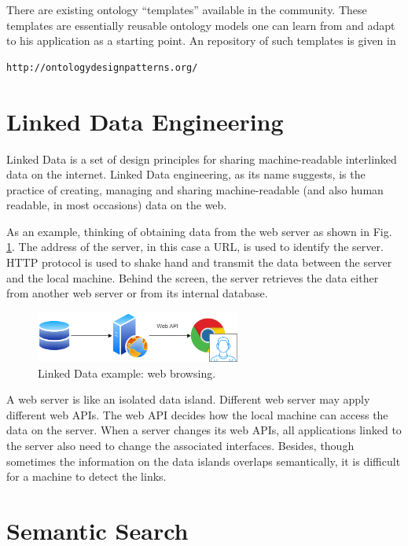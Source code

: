 There are existing ontology ``templates'' available in the community. These templates are essentially reusable ontology models one can learn from and adapt to his application as a starting point. An repository of such templates is given in 
\begin{lstlisting}
http://ontologydesignpatterns.org/
\end{lstlisting}

\section{Linked Data Engineering}

Linked Data is a set of design principles for sharing machine-readable interlinked data on the internet. Linked Data engineering, as its name suggests, is the practice of creating, managing and sharing machine-readable (and also human readable, in most occasions) data on the web.

As an example, thinking of obtaining data from the web server as shown in Fig. \ref{fig:webbrowsing}. The address of the server, in this case a URL, is used to identify the server. HTTP protocol is used to shake hand and transmit the data between the server and the local machine. Behind the screen, the server retrieves the data either from another web server or from its internal database.
\begin{figure}[htbp]
	\centering
	\includegraphics[width=0.6\textwidth]{./chapters/ch-semanticwebpractice/figures/webbrowsing.png}
	\caption{Linked Data example: web browsing.}
	\label{fig:webbrowsing}
\end{figure}

A web server is like an isolated data island. Different web server may apply different web APIs. The web API decides how the local machine can access the data on the server. When a server changes its web APIs, all applications linked to the server also need to change the associated interfaces. Besides, though sometimes the information on the data islands overlaps semantically, it is difficult for a machine to detect the links.  






\section{Semantic Search}


